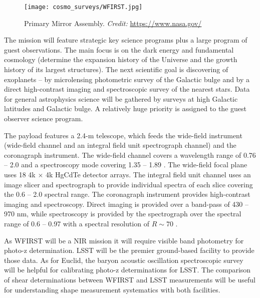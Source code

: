 \begin{figure}[htb]
    \centering
    \texttt{[image: cosmo\_surveys/WFIRST.jpg]}
    \caption{Primary Mirror Assembly. \textit{Credit:} \url{https://www.nasa.gov/}}
    \label{fig:wfirst}
\end{figure}
The mission will feature strategic key science programs plus a large program of guest observations. The main focus is on the dark energy and fundamental cosmology (determine the expansion history of the Universe and the growth history of its largest structures). The next scientific goal is discovering of exoplanets -- by microlensing photometric survey of the Galactic bulge and by a direct high-contrast imaging and spectroscopic survey of the nearest stars. Data for general astrophysics science will be gathered by surveys at high Galactic latitudes and Galactic bulge. A relatively huge priority is assigned to the guest observer science program.

The payload features a 2.4-m telescope, which feeds the wide-field instrument (wide-field channel and an integral field unit spectrograph channel) and the coronagraph instrument. The wide-field channel covers a wavelength range of 0.76 -- 2.0 \um and a spectroscopy mode covering 1.35 -- 1.89 \um. The wide-field focal plane uses 18 4k $\times$ 4k HgCdTe detector arrays. The integral field unit channel uses an image slicer and spectrograph to provide individual spectra of each slice covering the 0.6 -- 2.0 \um spectral range. The coronagraph instrument provides high-contrast imaging and spectroscopy. Direct imaging is provided over a band-pass of 430 -- 970 nm, while spectroscopy is provided by the spectrograph over the spectral range of 0.6 -- 0.97 \um with a spectral resolution of $R\sim70$ \cite{WFIRST_report}.

As WFIRST will be a NIR mission it will require visible band photometry for photo-z determination. LSST will be the premier ground-based facility to provide those data. As for Euclid, the baryon acoustic oscillation spectroscopic survey will be helpful for calibrating photo-z determinations for LSST. The comparison of shear determinations between WFIRST and LSST measurements will be useful for understanding shape measurement systematics with both facilities.